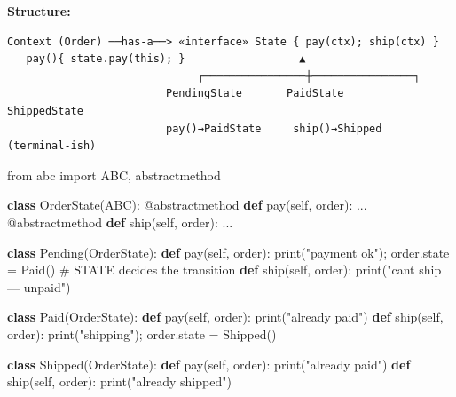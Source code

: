 \documentclass[11pt]{article}
\newenvironment{Shaded}{\begin{snugshade}}{\end{snugshade}}
\newcommand{\AttributeTok}[1]{\textcolor[rgb]{0.16,0.50,0.73}{#1}}
\newcommand{\BuiltInTok}[1]{\textcolor[rgb]{0.50,0.55,0.55}{#1}}
\newcommand{\CommentTok}[1]{\textcolor[rgb]{0.48,0.49,0.49}{#1}}
\newcommand{\ImportTok}[1]{\textcolor[rgb]{0.15,0.68,0.38}{#1}}
\newcommand{\KeywordTok}[1]{\textcolor[rgb]{0.81,0.81,0.76}{\textbf{#1}}}
\newcommand{\NormalTok}[1]{\textcolor[rgb]{0.81,0.81,0.76}{#1}}
\newcommand{\OperatorTok}[1]{\textcolor[rgb]{0.81,0.81,0.76}{#1}}
\newcommand{\StringTok}[1]{\textcolor[rgb]{0.96,0.31,0.31}{#1}}
\newcommand{\VariableTok}[1]{\textcolor[rgb]{0.15,0.68,0.68}{#1}}
\begin{document}
\textbf{Structure:}

\setcodelang{}

\begin{verbatim}
Context (Order) ──has-a──> «interface» State { pay(ctx); ship(ctx) }
   pay(){ state.pay(this); }                  ▲
                              ┌────────────────┼────────────────┐
                         PendingState       PaidState        ShippedState
                         pay()→PaidState     ship()→Shipped   (terminal-ish)
\end{verbatim}


\begin{Shaded}
\begin{Highlighting}[]
\ImportTok{from}\NormalTok{ abc }\ImportTok{import}\NormalTok{ ABC, abstractmethod}

\KeywordTok{class}\NormalTok{ OrderState(ABC):}
    \AttributeTok{@abstractmethod}
    \KeywordTok{def}\NormalTok{ pay(}\VariableTok{self}\NormalTok{, order): ...}
    \AttributeTok{@abstractmethod}
    \KeywordTok{def}\NormalTok{ ship(}\VariableTok{self}\NormalTok{, order): ...}

\KeywordTok{class}\NormalTok{ Pending(OrderState):}
    \KeywordTok{def}\NormalTok{ pay(}\VariableTok{self}\NormalTok{, order):}
        \BuiltInTok{print}\NormalTok{(}\StringTok{"payment ok"}\NormalTok{)}\OperatorTok{;}\NormalTok{ order.state }\OperatorTok{=}\NormalTok{ Paid()     }\CommentTok{\# STATE decides the transition}
    \KeywordTok{def}\NormalTok{ ship(}\VariableTok{self}\NormalTok{, order): }\BuiltInTok{print}\NormalTok{(}\StringTok{"can\textquotesingle{}t ship — unpaid"}\NormalTok{)}

\KeywordTok{class}\NormalTok{ Paid(OrderState):}
    \KeywordTok{def}\NormalTok{ pay(}\VariableTok{self}\NormalTok{, order): }\BuiltInTok{print}\NormalTok{(}\StringTok{"already paid"}\NormalTok{)}
    \KeywordTok{def}\NormalTok{ ship(}\VariableTok{self}\NormalTok{, order):}
        \BuiltInTok{print}\NormalTok{(}\StringTok{"shipping"}\NormalTok{)}\OperatorTok{;}\NormalTok{ order.state }\OperatorTok{=}\NormalTok{ Shipped()}

\KeywordTok{class}\NormalTok{ Shipped(OrderState):}
    \KeywordTok{def}\NormalTok{ pay(}\VariableTok{self}\NormalTok{, order): }\BuiltInTok{print}\NormalTok{(}\StringTok{"already paid"}\NormalTok{)}
    \KeywordTok{def}\NormalTok{ ship(}\VariableTok{self}\NormalTok{, order): }\BuiltInTok{print}\NormalTok{(}\StringTok{"already shipped"}\NormalTok{)}


\end{Highlighting}
\end{Shaded}
\end{document}
